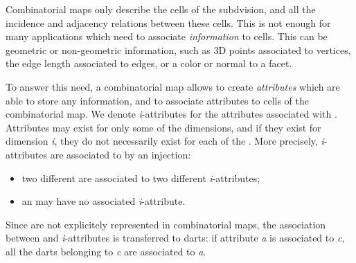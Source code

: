 Combinatorial maps only describe the cells of the subdvision, and all
the incidence and adjacency relations between these cells. This is not
enough for many applications which need to associate
\emph{information} to cells.  This can be geometric or non-geometric
information, such as 3D points associated to vertices, the edge length
associated to edges, or a color or normal to a facet.

To answer this need, a combinatorial map allows to create
\emph{attributes} which are able to store any information, and to
associate attributes to cells of the combinatorial map.  We denote
\emph{i}-attributes for the attributes associated with
. Attributes may exist for only some of the dimensions, and
if they exist for dimension \emph{i}, they do not necessarily exist for
each of the .  More precisely, \emph{i}-attributes are associated
to  by an injection:
\begin{itemize}
\item two different  are associated to two different
  \emph{i}-attributes;
\item an  may have no associated \emph{i}-attribute.
\end{itemize}

Since  are not explicitely represented in combinatorial maps,
the association between  and \emph{i}-attributes is transferred to
darts: if attribute \emph{a} is associated to  \emph{c}, all the darts
belonging to \emph{c} are associated to \emph{a}.

